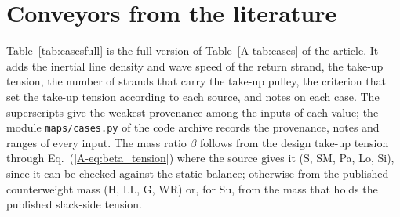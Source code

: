 \section{Conveyors from the literature}\label{supp:cases}

Table~\ref{tab:casesfull} is the full version of Table~\ref{A-tab:cases} of the article. It adds
the inertial line density and wave speed of the return strand, the take-up tension, the number
of strands that carry the take-up pulley, the criterion that set the take-up tension according
to each source, and notes on each case. The superscripts give the weakest provenance among the
inputs of each value; the module \texttt{maps/cases.py} of the code archive records the
provenance, notes and ranges of every input. The mass ratio $\beta$ follows from the design
take-up tension through Eq.~(\ref{A-eq:beta_tension}) where the source gives it (S, SM, Pa, Lo,
Si), since it can be checked against the static balance; otherwise from the published
counterweight mass (H, LL, G, WR) or, for Su, from the mass that holds the published slack-side
tension.


